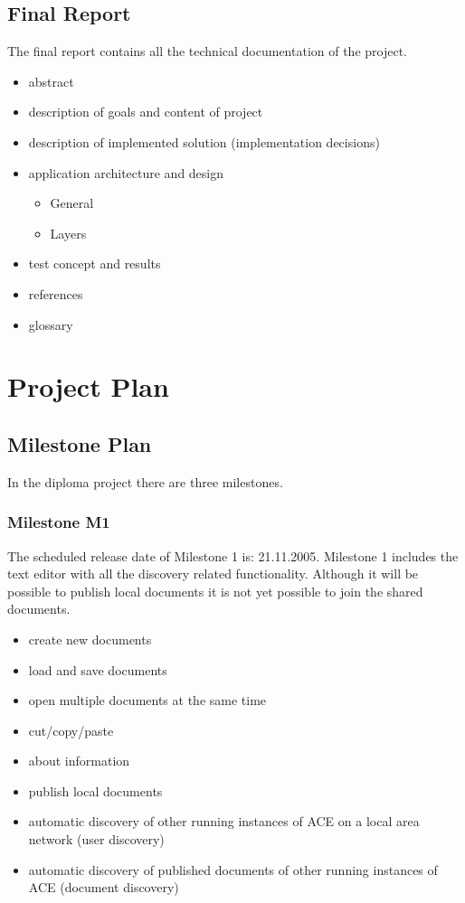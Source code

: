 \documentclass[11pt,a4paper]{article}
\begin{document}
\subsection{Final Report}
The final report contains all the technical documentation of the project.
\begin{itemize}
 \item abstract
 \item description of goals and content of project
 \item description of implemented solution (implementation decisions)
 \item application architecture and design
 \begin{itemize}
  \item General
  \item Layers
 \end{itemize}
 \item test concept and results
 \item references
 \item glossary
\end{itemize}

\section{Project Plan}

\subsection{Milestone Plan}

In the diploma project there are three milestones.

\subsubsection{Milestone M1}

The scheduled release date of Milestone 1 is: 21.11.2005. Milestone 1 includes the text editor with
all the discovery related functionality. Although it will be possible to publish local documents
it is not yet possible to join the shared documents.

\begin{itemize}
 \item create new documents
 \item load and save documents
 \item open multiple documents at the same time
 \item cut/copy/paste
 \item about information
 \item publish local documents
 \item automatic discovery of other running instances of ACE on a local area network (user discovery)
 \item automatic discovery of published documents of other running instances of ACE (document discovery)
\end{itemize}
\end{document}
